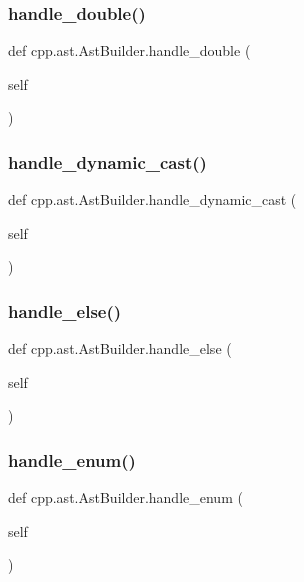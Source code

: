 \subsubsection{\texorpdfstring{handle\_double()}{handle\_double()}}
{\footnotesize\ttfamily def cpp.\+ast.\+Ast\+Builder.\+handle\+\_\+double (\begin{DoxyParamCaption}\item[{}]{self }\end{DoxyParamCaption})}

\mbox{\label{classcpp_1_1ast_1_1AstBuilder_a659b5ad02ffebe26c1496a319128fbd1}} 
\subsubsection{\texorpdfstring{handle\_dynamic\_cast()}{handle\_dynamic\_cast()}}
{\footnotesize\ttfamily def cpp.\+ast.\+Ast\+Builder.\+handle\+\_\+dynamic\+\_\+cast (\begin{DoxyParamCaption}\item[{}]{self }\end{DoxyParamCaption})}

\mbox{\label{classcpp_1_1ast_1_1AstBuilder_aeb676b03467a93454be018ac243f89a2}} 
\subsubsection{\texorpdfstring{handle\_else()}{handle\_else()}}
{\footnotesize\ttfamily def cpp.\+ast.\+Ast\+Builder.\+handle\+\_\+else (\begin{DoxyParamCaption}\item[{}]{self }\end{DoxyParamCaption})}

\mbox{\label{classcpp_1_1ast_1_1AstBuilder_a341a6ffabadd444a345c8c98a611774c}} 
\subsubsection{\texorpdfstring{handle\_enum()}{handle\_enum()}}
{\footnotesize\ttfamily def cpp.\+ast.\+Ast\+Builder.\+handle\+\_\+enum (\begin{DoxyParamCaption}\item[{}]{self }\end{DoxyParamCaption})}

